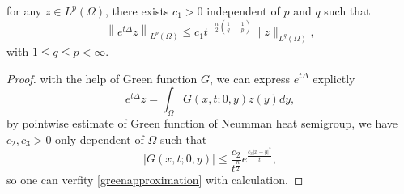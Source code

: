 \begin{lemma}
	for any $z\in L^p(\Omega)$, there exists $c_1>0$ independent of $p$ and $q$ such that
	\begin{equation}\label{greenapproximation}
		\left\|e^{t \Delta} z\right\|_{L^{p}(\Omega)} \leqslant c_{1} t^{-\frac{n}{2}\left(\frac{1}{q}-\frac{1}{p}\right)}\|z\|_{L^{q}(\Omega)},
	\end{equation}
with $1\leqslant q\leqslant p < \infty.$
\end{lemma}
\begin{proof}
	with the help of Green function $G$, we can express $e^{t\Delta}$ explictly 
	\begin{equation}
		e^{t\Delta}z = \int_{\Omega}G(x,t;0,y)z(y)\mathit{d}y,
	\end{equation}
by pointwise estimate of Green function of Neumman heat semigroup, we have $c_2,c_3>0$ only dependent of $\Omega$ such that
\begin{equation}
	|G(x,t;0,y)| \leqslant \dfrac{c_2}{t^\frac{n}{2}}e^{\frac{c_3|x-y|^2}{t}},
\end{equation}
so one can verfity \eqref{greenapproximation} with calculation.
\end{proof}


